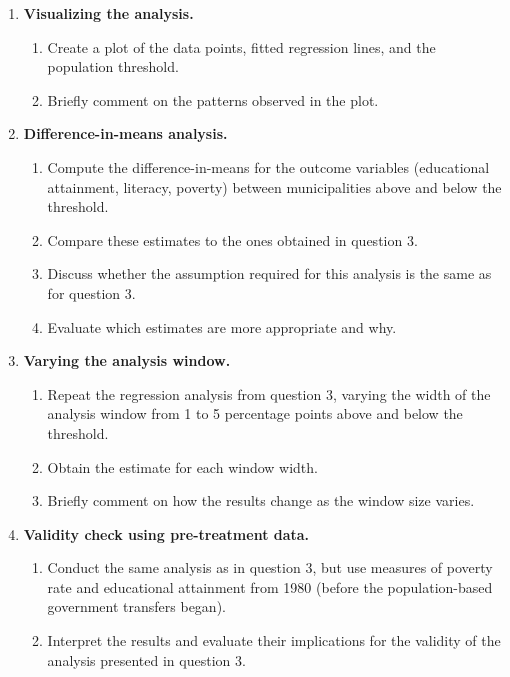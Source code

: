\documentclass[12pt]{article}
\begin{document}
\begin{enumerate}
    \item \textbf{Visualizing the analysis.}
    \begin{enumerate}[label=(\alph*)]
        \item Create a plot of the data points, fitted regression lines, and the population threshold.
        \item Briefly comment on the patterns observed in the plot.
    \end{enumerate}

    \item \textbf{Difference-in-means analysis.}
    \begin{enumerate}[label=(\alph*)]
        \item Compute the difference-in-means for the outcome variables (educational attainment, literacy, poverty) between municipalities above and below the threshold.
        \item Compare these estimates to the ones obtained in question 3.
        \item Discuss whether the assumption required for this analysis is the same as for question 3.
        \item Evaluate which estimates are more appropriate and why.
    \end{enumerate}

    \item \textbf{Varying the analysis window.}
    \begin{enumerate}[label=(\alph*)]
        \item Repeat the regression analysis from question 3, varying the width of the analysis window from 1 to 5 percentage points above and below the threshold.
        \item Obtain the estimate for each window width.
        \item Briefly comment on how the results change as the window size varies.
    \end{enumerate}

    \item \textbf{Validity check using pre-treatment data.}
    \begin{enumerate}[label=(\alph*)]
        \item Conduct the same analysis as in question 3, but use measures of poverty rate and educational attainment from 1980 (before the population-based government transfers began).
        \item Interpret the results and evaluate their implications for the validity of the analysis presented in question 3.
    \end{enumerate}
\end{enumerate}
\end{document}
